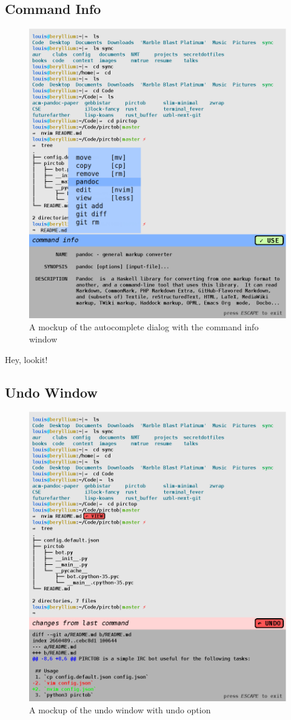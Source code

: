 \subsection{Command Info}

\begin{figure}[H]
  \centering
  \includegraphics[width=0.8\linewidth]{figures/interface/files.eps}
  \caption{A mockup of the autocomplete dialog with the command info window}
  \label{fig:cmdinfo}
\end{figure}

Hey, lookit!

\subsection{Undo Window}

\begin{figure}[H]
  \centering
  \includegraphics[width=0.8\linewidth]{figures/interface/undo.eps}
  \caption{A mockup of the undo window with undo option}
  \label{fig:undo}
\end{figure}

